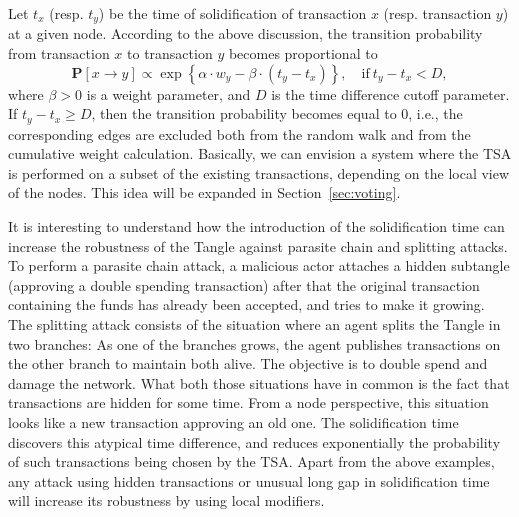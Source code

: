 \documentclass[../main.tex]{subfiles}
\begin{document}
Let $t_x$ (resp. $t_y$) be the time of solidification of transaction $x$ (resp. transaction $y$) at a given node. According to the above discussion, the transition probability from transaction $x$ to transaction $y$ becomes proportional to
\begin{equation}\label{eq:rw_prob}
    \mathbf{P}[x\rightarrow y]\propto \exp\left\{\alpha\cdot w_y - \beta\cdot(t_y-t_x)\right\}, \quad \text{if} \ t_y - t_x < D,
\end{equation}
where $\beta>0$ is a weight parameter, and $D$ is the time difference cutoff parameter. If $t_y - t_x\geq D$, then the transition probability becomes equal to 0, i.e., the corresponding edges are excluded both from the random walk and from the cumulative weight calculation. Basically, we can envision a system where the TSA is performed on a subset of the existing transactions, depending on the local view of the nodes. This idea will be expanded in Section~\ref{sec:voting}. 

It is interesting to understand how the introduction of the solidification time can increase the robustness of the Tangle against parasite chain and splitting attacks.
To perform a parasite chain attack, a malicious actor attaches a hidden subtangle (approving a double spending transaction) after that the original transaction containing the funds has already been accepted, and tries to make it growing.
The splitting attack consists of the situation where an agent splits the Tangle in two branches: As one of the branches grows, the agent publishes transactions on the other branch to maintain both alive. The objective is to double spend and damage the network. 
What both those situations have in common is the fact that transactions are hidden for some time. From a node perspective, this situation looks like a new transaction approving an old one. The solidification time discovers this atypical time difference, and reduces exponentially the probability of such transactions being chosen by the TSA. Apart from the above examples, any attack using hidden transactions or unusual long gap in solidification time will increase its robustness by using local modifiers.
\end{document}
